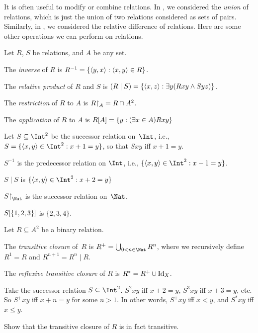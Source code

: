 \documentclass[../../../include/open-logic-section]{subfiles}
\begin{document}

It is often useful to modify or combine relations. In
, we considered the \emph{union}
of relations, which is just the union of two relations considered as
sets of pairs. Similarly, in ,
we considered the relative difference of relations. Here are some
other operations we can perform on relations.

\begin{defn} 
Let $R$, $S$ be relations, and $A$ be any set. 

The \emph{inverse} of $R$ is $R^{-1} = \{ \langle y, x \rangle : \langle x,
    y \rangle \in R \}$.

The \emph{relative product} of $R$ and $S$ is $(R \mid S) =
\{\langle x, z \rangle : \exists y(Rxy \land Syz)\}$.

The \emph{restriction} of $R$ to $A$ is $R\mathord{\restriction}_{A}= R
\cap A^2$.

The \emph{application} of $R$ to $A$ is $R[A] = \{y :
(\exists x \in A)Rxy\}$
\end{defn}

\begin{ex}
Let $S \subseteq \Int^2$ be the successor relation on~$\Int$, i.e.,
$S = \Setabs{\tuple{x, y} \in \Int^2}{x + 1 = y}$, so that $Sxy$ iff $x + 1 = y$.

$S^{-1}$ is the predecessor relation on $\Int$, i.e.,
$\Setabs{\tuple{x,y}\in\Int^2}{x -1 =y}$.

$S\mid S$ is 
$ \Setabs{\tuple{x,y}\in\Int^2}{x + 2 =y}$

$\funrestrictionto{S}{\Nat}$ is the successor relation on~$\Nat$.

$S[\{1,2,3\}]$ is $\{2, 3, 4\}$.
\end{ex}

\begin{defn}Let $R \subseteq A^2$ be a binary relation. 
	
The \emph{transitive closure} of~$R$ is $R^+ = \bigcup_{0 < n \in
\Nat} R^n$, where we recursively define $R^1 = R$ and $R^{n+1} = R^n
\mid R$.

The \emph{reflexive transitive closure} of $R$ is $R^* = R^+ \cup
\mathord{\mathrm{Id}_{X}}$.
\end{defn}

\begin{ex}
Take the successor relation $S \subseteq \Int^2$. $S^2xy$ iff $x + 2 =
y$, $S^3xy$ iff $x + 3 = y$, etc. So $S^+xy$ iff $x + n = y$ for some
$n > 1$. In other words, $S^+xy$ iff $x < y$, and $S^*xy$ iff $x \le
y$.
\end{ex}

\begin{prob}
Show that the transitive closure of $R$ is in fact transitive.
\end{prob}
\end{document}

